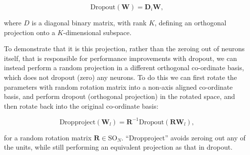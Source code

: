 \documentclass[thesis]{subfiles}
\begin{document}
\begin{equation}
    \textrm{Dropout}(\mathbf{W}) = \mathbf{D}_{i} \mathbf{W},
\end{equation}

where $D$ is a diagonal binary matrix, with rank $K$, defining an orthogonal projection onto a $K$-dimensional subspace. 

To demonstrate that it is this projection, rather than the zeroing out of neurons itself, that is responsible for performance improvements with dropout, we can instead perform a random projection in a different orthogonal co-ordinate basis, which does not dropout (zero) any neurons. To do this we can first rotate the parameters with random rotation matrix into a non-axis aligned co-ordinate basis, and perform dropout (orthogonal projection) in the rotated space, and then rotate back into the original co-ordinate basis:

\begin{equation}
    \textrm{Dropproject}(\mathbf{W}_l) = \mathbf{R}^{-1}\textrm{Dropout}(\mathbf{R} \mathbf{W}_l),
\end{equation}

for a random rotation matrix $\mathbf{R}\in \textrm{SO}_N$. ``Dropproject'' avoids zeroing out any of the units, while still performing an equivalent projection as that in dropout.
\end{document}
